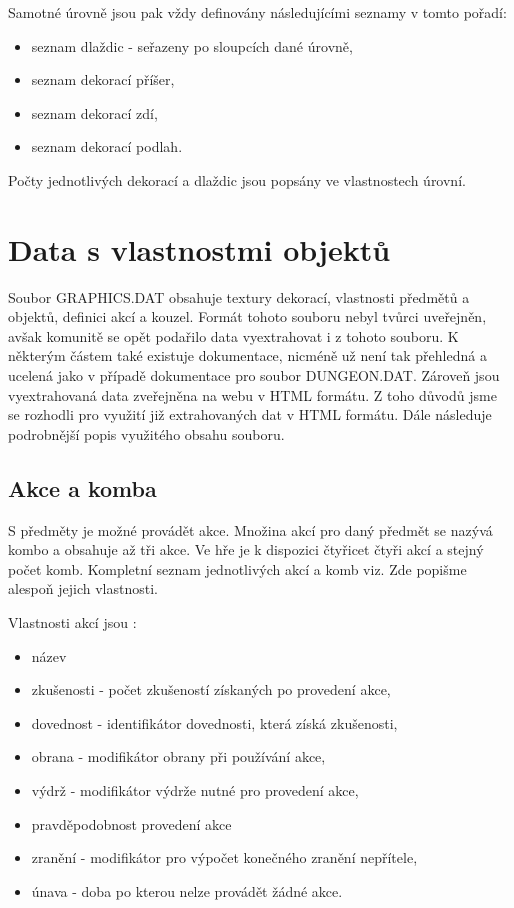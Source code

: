 Samotné úrovně jsou pak vždy definovány následujícími seznamy v tomto pořadí:
\begin{itemize}
\item seznam dlaždic - seřazeny po sloupcích dané úrovně,
\item seznam dekorací příšer,
\item seznam dekorací zdí, 
\item seznam dekorací podlah.
\end{itemize}
Počty jednotlivých dekorací a dlaždic jsou popsány ve vlastnostech úrovní.

\section{Data s vlastnostmi objektů }\label{dungeon-properties}

Soubor GRAPHICS.DAT obsahuje textury dekorací, vlastnosti předmětů a objektů, definici akcí a kouzel.
Formát tohoto souboru nebyl tvůrci uveřejněn, avšak komunitě se opět podařilo data
vyextrahovat i z tohoto souboru. K některým částem také existuje dokumentace\cite{DMGraphicsDAT}, 
nicméně už není tak přehledná a ucelená jako v případě dokumentace pro soubor DUNGEON.DAT. Zároveň 
jsou vyextrahovaná data zveřejněna na webu v HTML formátu. Z toho důvodů jsme se rozhodli 
pro využití již extrahovaných dat v HTML formátu. Dále následuje podrobnější popis využitého obsahu souboru.

\subsection{Akce a komba}

S předměty je možné provádět akce. Množina akcí pro daný předmět se nazývá kombo a obsahuje 
až tři akce. Ve hře je k dispozici čtyřicet čtyři akcí a stejný počet komb. Kompletní seznam jednotlivých
akcí a komb viz\cite{DMActions}. Zde popišme alespoň jejich vlastnosti.

Vlastnosti akcí jsou :
\begin{itemize}
\item název 
\item zkušenosti - počet zkušeností získaných po provedení akce,
\item dovednost - identifikátor dovednosti, která získá zkušenosti,
\item obrana - modifikátor obrany při používání akce,
\item výdrž - modifikátor výdrže nutné pro provedení akce, 
\item pravděpodobnost provedení akce 
\item zranění - modifikátor pro výpočet konečného zranění nepřítele, 
\item únava - doba po kterou nelze provádět žádné akce. 
\end{itemize}


